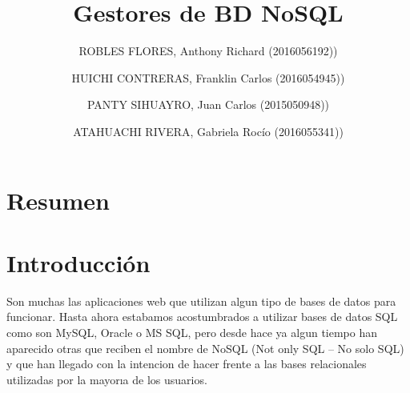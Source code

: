 \documentclass[preprint,12pt]{elsarticle}
\begin{document}
	
	\begin{frontmatter} 

		\title{\huge Gestores de BD NoSQL}
		
		\author{ROBLES FLORES, Anthony Richard     (2016056192))}
		\author{HUICHI CONTRERAS, Franklin Carlos          	(2016054945))}
		\author{PANTY SIHUAYRO, Juan Carlos         	(2015050948))}  
		\author{ATAHUACHI RIVERA, Gabriela Rocío                (2016055341))} 
		\address{Escuela Profesional de Ingeniería de Sistemas}
		\address{Universidad Privada de Tacna}
		\address{Tacna, Perú}
		

		\begin{abstract}
		


		\end{abstract}


	\end{frontmatter}


\section{Resumen}






\section{Introducción} 
Son muchas las aplicaciones web que utilizan algun
tipo de bases de datos para funcionar. Hasta ahora
estabamos acostumbrados a utilizar bases de datos SQL
como son MySQL, Oracle o MS SQL, pero desde hace
ya algun tiempo han aparecido otras que reciben el nombre de NoSQL (Not only SQL – No solo SQL) y que
han llegado con la intencion de hacer frente a las bases
relacionales utilizadas por la mayorıa de los usuarios.
\end{document}
